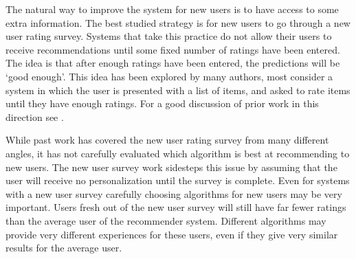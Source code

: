 \documentclass[letterpaper]{sig-alternate}
\begin{document}
 
  The natural way to improve the system for new users is to have access to some extra information.
  The best studied strategy is for new users to go through a new user rating survey.
  Systems that take this practice do not allow their users to receive recommendations until some fixed number of ratings have been entered.
  The idea is that after enough ratings have been entered, the predictions will be `good enough'.
  This idea has been explored by many authors, most consider a system in which the user is presented with a list of items, and asked to rate items until they have enough ratings.
  For a good discussion of prior work in this direction see \cite{adaptiveBootstrapping}.



  While past work has covered the new user rating survey from many different angles, it has not carefully evaluated which algorithm is best at recommending to new users.
  The new user survey work sidesteps this issue by assuming that the user will receive no personalization until the survey is complete.
  Even for systems with a new user survey carefully choosing algorithms for new users may be very important.
  Users fresh out of the new user survey will still have far fewer ratings than the average user of the recommender system.
  Different algorithms may provide very different experiences for these users, even if they give very similar results for the average user.
  
\end{document}
